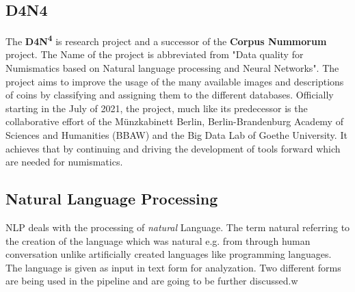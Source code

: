 \documentclass[12pt, oneside]{article}
\begin{document}
\newpage
\subsection{D4N4}
The \textbf{D4N\textsuperscript{4}} is research project and a successor of the \textbf{Corpus Nummorum} project. The Name of the project is abbreviated from "Data quality for Numismatics based on Natural language processing and Neural Networks". The project aims to improve the usage of the many available images and descriptions of coins by classifying and assigning them to the different databases. Officially starting in the July of 2021, the project, much like its predecessor is the collaborative effort of the Münzkabinett Berlin, Berlin-Brandenburg Academy of Sciences and Humanities (BBAW) and the Big Data Lab of Goethe University. It achieves that by continuing and driving the development of tools forward which are needed for numismatics.
\subsection{Natural Language Processing} \label{nlp}
NLP deals with the processing of \textit{natural} Language. The term natural referring to the creation of the language which was natural e.g. from through human conversation unlike artificially created languages like programming languages. The language is given as input in text form for analyzation.
Two different forms are being used in the pipeline and are going to be further discussed.w
\end{document}
